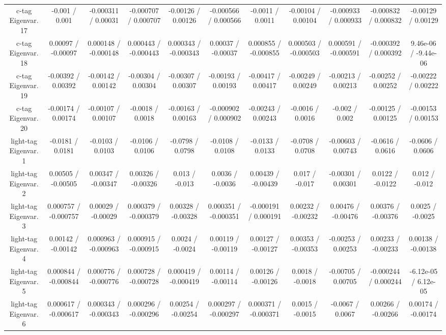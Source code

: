 \begin{table}[htbp]
\begin{center}
\begin{tabular}{|c|c|c|c|c|c|c|c|c|c|c|}
  c-tag Eigenvar. 17 & -0.001 / 0.001 & -0.000311 / 0.00031 & -0.000707 / 0.000707 & -0.00126 / 0.00126 & -0.000566 / 0.000566 & -0.0011 / 0.0011 & -0.00104 / 0.00104 & -0.000933 / 0.000933 & -0.000832 / 0.000832 & -0.00129 / 0.00129 \\ 
  c-tag Eigenvar. 18 & 0.00097 / -0.00097 & 0.000148 / -0.000148 & 0.000443 / -0.000443 & 0.000343 / -0.000343 & 0.00037 / -0.00037 & 0.000855 / -0.000855 & 0.000503 / -0.000503 & 0.000591 / -0.000591 & -0.000392 / 0.000392 & 9.46e-06 / -9.44e-06 \\ 
  c-tag Eigenvar. 19 & -0.00392 / 0.00392 & -0.00142 / 0.00142 & -0.00304 / 0.00304 & -0.00307 / 0.00307 & -0.00193 / 0.00193 & -0.00417 / 0.00417 & -0.00249 / 0.00249 & -0.00213 / 0.00213 & -0.00252 / 0.00252 & -0.00222 / 0.00222 \\ 
  c-tag Eigenvar. 20 & -0.00174 / 0.00174 & -0.00107 / 0.00107 & -0.0018 / 0.0018 & -0.00163 / 0.00163 & -0.000902 / 0.000902 & -0.00243 / 0.00243 & -0.0016 / 0.0016 & -0.002 / 0.002 & -0.00125 / 0.00125 & -0.00153 / 0.00153 \\ 
  light-tag Eigenvar. 1 & -0.0181 / 0.0181 & -0.0103 / 0.0103 & -0.0106 / 0.0106 & -0.0798 / 0.0798 & -0.0108 / 0.0108 & -0.0133 / 0.0133 & -0.0708 / 0.0708 & -0.00603 / 0.00743 & -0.0616 / 0.0616 & -0.0606 / 0.0606 \\ 
  light-tag Eigenvar. 2 & 0.00505 / -0.00505 & 0.00347 / -0.00347 & 0.00326 / -0.00326 & 0.013 / -0.013 & 0.0036 / -0.0036 & 0.00439 / -0.00439 & 0.017 / -0.017 & -0.00301 / 0.00301 & 0.0122 / -0.0122 & 0.012 / -0.012 \\ 
  light-tag Eigenvar. 3 & 0.000757 / -0.000757 & 0.00029 / -0.00029 & 0.000379 / -0.000379 & 0.00328 / -0.00328 & 0.000351 / -0.000351 & -0.000191 / 0.000191 & 0.00232 / -0.00232 & 0.00476 / -0.00476 & 0.00376 / -0.00376 & 0.0025 / -0.0025 \\ 
  light-tag Eigenvar. 4 & 0.00142 / -0.00142 & 0.000963 / -0.000963 & 0.000915 / -0.000915 & 0.0024 / -0.0024 & 0.00119 / -0.00119 & 0.00127 / -0.00127 & 0.00353 / -0.00353 & -0.00253 / 0.00253 & 0.00233 / -0.00233 & 0.00138 / -0.00138 \\ 
  light-tag Eigenvar. 5 & 0.000844 / -0.000844 & 0.000776 / -0.000776 & 0.000728 / -0.000728 & 0.000419 / -0.000419 & 0.00114 / -0.00114 & 0.00126 / -0.00126 & 0.0018 / -0.0018 & -0.00705 / 0.00705 & -0.000244 / 0.000244 & -6.12e-05 / 6.12e-05 \\ 
  light-tag Eigenvar. 6 & 0.000617 / -0.000617 & 0.000343 / -0.000343 & 0.000296 / -0.000296 & 0.00254 / -0.00254 & 0.000297 / -0.000297 & 0.000371 / -0.000371 & 0.0015 / -0.0015 & -0.0067 / 0.0067 & 0.00266 / -0.00266 & 0.00174 / -0.00174 \\ 

\end{tabular}
\end{center}
\end{table}
